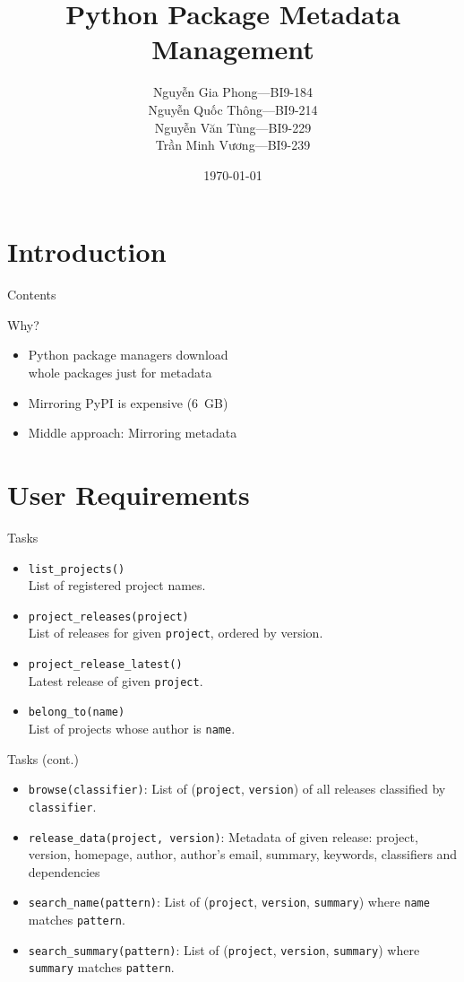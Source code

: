 \documentclass[pdf]{beamer}
\title{Python Package Metadata Management}
\author[Group 8]{Nguyễn Gia Phong---BI9-184\\
                 Nguyễn Quốc Thông---BI9-214\\
                 Nguyễn Văn Tùng---BI9-229\\
                 Trần Minh Vương---BI9-239}
\institute{University of Science and Technology of Hà Nội}
\date{\selectlanguage{english}\today}
\newcommand{\byte}{B}
\begin{document}
\frame{\titlepage}

\section{Introduction}
\begin{frame}{Contents}
  \tableofcontents
\end{frame}

\begin{frame}{Why?}\Large
  \begin{itemize}
    \item Python package managers download\\
      whole packages just for metadata
    \item Mirroring PyPI is expensive (\SI{6}{\giga\byte})
    \item Middle approach: Mirroring metadata
  \end{itemize}
\end{frame}

\section{User Requirements}
\frame{\tableofcontents[currentsection]}
\begin{frame}[fragile]{Tasks}
  \begin{itemize}
    \item \verb|list_projects()|\\
      List of registered project names.
    \item \verb|project_releases(project)|\\
      List of releases for given \verb|project|, ordered by version.
    \item \verb|project_release_latest()|\\
      Latest release of given \verb|project|.
    \item \verb|belong_to(name)|\\
      List of projects whose author is \verb|name|.
  \end{itemize}
\end{frame}

\begin{frame}[fragile]{Tasks (cont.)}
  \begin{itemize}
    \item \verb|browse(classifier)|: List of (\verb|project|,
      \verb|version|) of all releases classified by \verb|classifier|.
    \item \verb|release_data(project, version)|: Metadata of given release:
      project, version, homepage, author, author's email, summary, keywords,
      classifiers and dependencies
    \item \verb|search_name(pattern)|: List of (\verb|project|,
      \verb|version|, \verb|summary|) where \verb|name| matches \verb|pattern|.
    \item \verb|search_summary(pattern)|: List of (\verb|project|,
      \verb|version|, \verb|summary|) where \verb|summary| matches \verb|pattern|.
  \end{itemize}
\end{frame}
\end{document}
